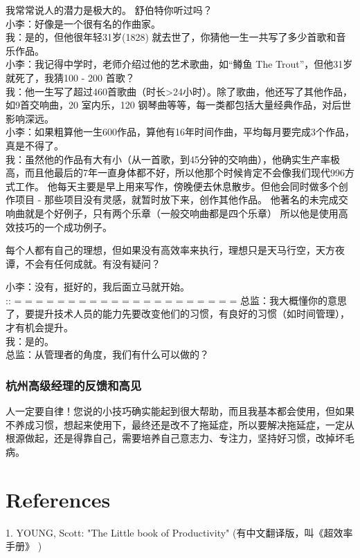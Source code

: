 我常常说人的潜力是极大的。 舒伯特你听过吗？\\
小李：好像是一个很有名的作曲家。\\
我：是的，但他很年轻31岁(1828)
就去世了，你猜他一生一共写了多少首歌和音乐作品。\\
小李：我记得中学时，老师介绍过他的艺术歌曲，如``鳟鱼 The
Trout''，但他31岁就死了，我猜100 - 200 首歌？\\
我：他一生写了超过460首歌曲（时长\textgreater{}24小时）。除了歌曲，他还写了其他作品，如9首交响曲，20
室内乐，120 钢琴曲等等，每一类都包括大量经典作品，对后世影响深远。\\
小李：如果粗算他一生600作品，算他有16年时间作曲，平均每月要完成3个作品，真是不得了。\\
我：虽然他的作品有大有小（从一首歌，到45分钟的交响曲），他确实生产率极高，而且他最后的7年一直身体都不好，所以他那个时候肯定不会像我们现代996方式工作。
他每天主要是早上用来写作，傍晚便去休息散步。但他会同时做多个创作项目 -
那些项目没有灵感，就暂时放下来，创作其他作品。
他著名的未完成交响曲就是个好例子，只有两个乐章（一般交响曲都是四个乐章）
所以他是使用高效技巧的一个成功例子。

每个人都有自己的理想，但如果没有高效率来执行，理想只是天马行空，天方夜谭，不会有任何成就。有没有疑问？

小李：没有，挺好的，我后面立马就开始。\\
:: = = = = = = = = = = = = = = = = = = = = =
总监：我大概懂你的意思了，要提升技术人员的能力先要改变他们的习惯，有良好的习惯（如时间管理），才有机会提升。\\
我：是的。\\
总监：从管理者的角度，我们有什么可以做的？\\


\hypertarget{ux676dux5ddeux9ad8ux7ea7ux7ecfux7406ux7684ux53cdux9988ux548cux9ad8ux89c1}{%
\subsubsection{杭州高级经理的反馈和高见}\label{ux676dux5ddeux9ad8ux7ea7ux7ecfux7406ux7684ux53cdux9988ux548cux9ad8ux89c1}}

人一定要自律！您说的小技巧确实能起到很大帮助，而且我基本都会使用，但如果不养成习惯，想起来使用下，最终还是改不了拖延症，所以要解决拖延症，一定从根源做起，还是得靠自己，需要培养自己意志力、专注力，坚持好习惯，改掉坏毛病。

\hypertarget{references}{%
\section{References}\label{references}}

1. YOUNG, Scott: "The Little book of Productivity"
(有中文翻译版，叫《超效率手册》 )\\




